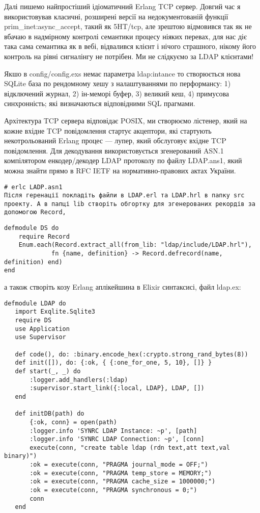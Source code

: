 Далі пишемо найпростіший ідіоматичний Erlang TCP сервер. Довгий час я використовував класичні, розширені версії на недокументованій функції prim_inet:async_accept, такий як 5HT/tcp, але зрештою відмовився так як не вбачаю в надмірному контролі семантики процесу ніяких перевах, для нас діє така сама семантика як в вебі, відвалився клієнт і нічого страшного, нікому його контроль на рівні сигналінгу не потрібен. Ми не слідкуємо за LDAP клієнтами!

Якшо в config/config.exs немає параметра ldap:intance то створюється нова SQLite база по рендомному хешу з налаштуваннями по перформансу: 1) відключений журнал, 2) ін-меморі буфер, 3) великий кеш, 4) примусова синхронність; які визначаються відповідними SQL прагмами.

Архітектура TCP сервера відповідає POSIX, ми створюємо лістенер, який на кожне вхідне TCP повідомлення стартує акцептори, які стартують некотрольований Erlang процес — лупер, який обслуговує вхідне TCP повідомлення. Для декодування використовується згенерований ASN.1 компілятором енкодер/декодер LDAP протоколу по файлу LDAP.ans1, який можна знайти прямо в RFC IETF на нормативно-правових актах України.

\begin{lstlisting}
# erlc LADP.asn1
Після геренації покладіть файли в LDAP.erl та LDAP.hrl в папку src проекту. А в папці lib створіть обгортку для згенерованих рекордів за допомогою Record,
\end{lstlisting}

\begin{lstlisting}
defmodule DS do
    require Record
    Enum.each(Record.extract_all(from_lib: "ldap/include/LDAP.hrl"),
             fn {name, definition} -> Record.defrecord(name, definition) end)
end
\end{lstlisting}

а також створіть козу Erlang аплікейшина в Elixir синтаксисі, файл ldap.ex:

\begin{lstlisting}
defmodule LDAP do
   import Exqlite.Sqlite3
   require DS
   use Application
   use Supervisor

   def code(), do: :binary.encode_hex(:crypto.strong_rand_bytes(8))
   def init([]), do: {:ok, { {:one_for_one, 5, 10}, []} }
   def start(_, _) do
       :logger.add_handlers(:ldap)
       :supervisor.start_link({:local, LDAP}, LDAP, [])
   end

   def initDB(path) do
       {:ok, conn} = open(path)
       :logger.info 'SYNRC LDAP Instance: ~p', [path]
       :logger.info 'SYNRC LDAP Connection: ~p', [conn]
       execute(conn, "create table ldap (rdn text,att text,val binary)")
       :ok = execute(conn, "PRAGMA journal_mode = OFF;")
       :ok = execute(conn, "PRAGMA temp_store = MEMORY;")
       :ok = execute(conn, "PRAGMA cache_size = 1000000;")
       :ok = execute(conn, "PRAGMA synchronous = 0;")
       conn
   end

\end{lstlisting}


